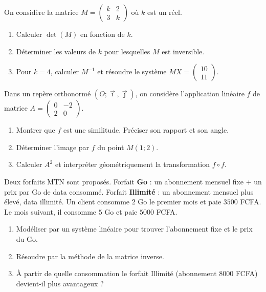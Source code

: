 \documentclass[11pt]{article}
\begin{document}
\begin{exercice}
On considère la matrice $M=\begin{pmatrix} k & 2 \\ 3 & k \end{pmatrix}$ où $k$ est un réel.
\begin{enumerate}
\item Calculer $\det(M)$ en fonction de $k$.
\item Déterminer les valeurs de $k$ pour lesquelles $M$ est inversible.
\item Pour $k=4$, calculer $M^{-1}$ et résoudre le système $MX=\begin{pmatrix} 10 \\ 11 \end{pmatrix}$.
\end{enumerate}
\end{exercice}

\begin{exercice}
Dans un repère orthonormé $(O;\vec{\imath},\vec{\jmath})$, on considère l'application linéaire $f$ de matrice $A=\begin{pmatrix} 0 & -2 \\ 2 & 0 \end{pmatrix}$.
\begin{enumerate}
\item Montrer que $f$ est une similitude. Préciser son rapport et son angle.
\item Déterminer l'image par $f$ du point $M(1;2)$.
\item Calculer $A^2$ et interpréter géométriquement la transformation $f\circ f$.
\end{enumerate}
\end{exercice}

\begin{exercice}
Deux forfaits MTN sont proposés.
Forfait \textbf{Go} : un abonnement mensuel fixe + un prix par Go de data consommé.
Forfait \textbf{Illimité} : un abonnement mensuel plus élevé, data illimité.
Un client consomme $2$ Go le premier mois et paie $\num{3500}$ FCFA. Le mois suivant, il consomme $5$ Go et paie $\num{5000}$ FCFA.
\begin{enumerate}
\item Modéliser par un système linéaire pour trouver l'abonnement fixe et le prix du Go.
\item Résoudre par la méthode de la matrice inverse.
\item À partir de quelle consommation le forfait Illimité (abonnement $\num{8000}$ FCFA) devient-il plus avantageux ?
\end{enumerate}
\end{exercice}
\end{document}
